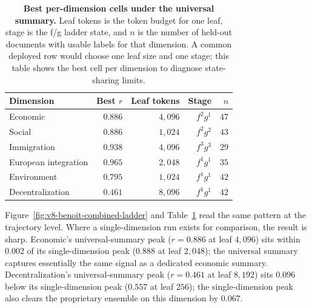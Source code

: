 \begin{table}[t]
  \centering
  \begin{tabular}{lrrrr}
    \toprule
    Dimension & Best \(r\) & Leaf tokens & Stage & \(n\) \\
    \midrule
    Economic & \(0.886\) & \(4{,}096\) & \(f^2g^1\) & \(47\) \\
    Social & \(0.886\) & \(1{,}024\) & \(f^2g^2\) & \(43\) \\
    Immigration & \(0.938\) & \(4{,}096\) & \(f^3g^3\) & \(29\) \\
    European integration & \(0.965\) & \(2{,}048\) & \(f^1g^1\) & \(35\) \\
    Environment & \(0.795\) & \(1{,}024\) & \(f^1g^1\) & \(42\) \\
    Decentralization & \(0.461\) & \(8{,}096\) & \(f^1g^1\) & \(42\) \\
    \bottomrule
  \end{tabular}
  \caption{\textbf{Best per-dimension cells under the universal summary.}
  Leaf tokens is the token budget for one leaf, stage is the f/g ladder state,
  and \(n\) is the number of held-out documents with usable labels for that
  dimension. A common deployed row would choose one leaf size and one stage;
  this table shows the best cell per dimension to diagnose state-sharing
  limits.}
  \label{tab:v8-benoit-joint-dim-best}
\end{table}

Figure~\ref{fig:v8-benoit-combined-ladder} and
Table~\ref{tab:v8-benoit-joint-dim-best} read the same pattern at the
trajectory level. Where a single-dimension run exists for comparison,
the result is sharp. Economic's universal-summary peak (\(r=0.886\) at
leaf \(4{,}096\)) sits within \(0.002\) of its single-dimension peak
(\(0.888\) at leaf \(2{,}048\)); the universal summary captures
essentially the same signal as a dedicated economic summary.
Decentralization's universal-summary peak (\(r=0.461\) at leaf
\(8{,}192\)) sits \(0.096\) below its single-dimension peak (\(0.557\)
at leaf \(256\)); the single-dimension peak also clears the proprietary
ensemble on this dimension by \(0.067\).

